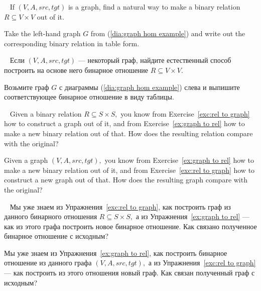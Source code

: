 \documentclass[../main/CT4S-EN-RU]{subfiles}
\begin{document}
\begin{exerciseENG}\label{ex:graph to rel}~
\sexc If $(V,A,src,tgt)$ is a graph, find a natural way to make a binary relation $R\subseteq V\times V$ out of it. 
\item Take the left-hand graph $G$ from (\ref{dia:graph hom example}) and write out the corresponding binary relation in table form.
\endsexc
\end{exerciseENG}

\begin{exerciseRUS}\label{ex:graph to rel}~
\sexc Если $(V,A,src,tgt)$ — некоторый граф, найдите естественный способ построить на основе него бинарное отношение $R\subseteq V\times V.$ 
\item Возьмите граф $G$ с диаграммы (\ref{dia:graph hom example}) слева и выпишите соответствующее бинарное отношение в виду таблицы.
\endsexc
\end{exerciseRUS}

\begin{exerciseENG}~
\sexc Given a binary relation $R\subseteq S\times S,$ you know from Exercise~\ref{exc:rel to graph} how to construct a graph out of it, and from Exercise~\ref{ex:graph to rel} how to make a new binary relation out of that. How does the resulting relation compare with the original?
\item Given a graph $(V,A,src,tgt),$ you know from Exercise~\ref{ex:graph to rel} how to make a new binary relation out of it, and from Exercise~\ref{exc:rel to graph} how to construct a new graph out of that. How does the resulting graph compare with the original? 
\endsexc
\end{exerciseENG}

\begin{exerciseRUS}~
\sexc Мы уже знаем из Упражнения~\ref{exc:rel to graph}, как построить граф из данного бинарного отношения $R\subseteq S\times S,$ а из Упражнения~\ref{ex:graph to rel} — как из этого графа построить новое бинарное отношение. Как связано полученное бинарное отношение с исходным?
\item Мы уже знаем из Упражнения~\ref{ex:graph to rel}, как построить бинарное отношение из данного графа $(V,A,src,tgt),$ а из Упражнения~\ref{exc:rel to graph} — как построить из этого отношения новый граф. Как связан полученный граф с исходным? 
\endsexc
\end{exerciseRUS}
\end{document}

